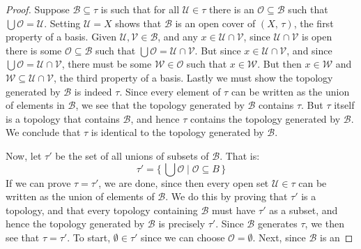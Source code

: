 \documentclass{article}
\theoremstyle{plain}
\theoremstyle{normal}
\begin{document}
        \begin{proof}
            Suppose $\mathcal{B}\subseteq\tau$ is such that for all
            $\mathcal{U}\in\tau$ there is an $\mathcal{O}\subseteq\mathcal{B}$
            such that $\bigcup\mathcal{O}=\mathcal{U}$. Setting
            $\mathcal{U}=X$ shows that $\mathcal{B}$ is an open cover of
            $(X,\,\tau)$, the first property of a basis. Given
            $\mathcal{U},\mathcal{V}\in\mathcal{B}$, and any
            $x\in\mathcal{U}\cap\mathcal{V}$, since $\mathcal{U}\cap\mathcal{V}$
            is open there is some $\mathcal{O}\subseteq\mathcal{B}$ such that
            $\bigcup\mathcal{O}=\mathcal{U}\cap\mathcal{V}$. But since
            $x\in\mathcal{U}\cap\mathcal{V}$, and since
            $\bigcup\mathcal{O}=\mathcal{U}\cap\mathcal{V}$, there must be some
            $\mathcal{W}\in\mathcal{O}$ such that $x\in\mathcal{W}$. But then
            $x\in\mathcal{W}$ and
            $\mathcal{W}\subseteq\mathcal{U}\cap\mathcal{V}$, the third property
            of a basis. Lastly we must show the topology generated by
            $\mathcal{B}$ is indeed $\tau$. Since every element of $\tau$ can
            be written as the union of elements in $\mathcal{B}$, we see that
            the topology generated by $\mathcal{B}$ contains $\tau$. But $\tau$
            itself is a topology that contains $\mathcal{B}$, and hence $\tau$
            contains the topology generated by $\mathcal{B}$. We conclude that
            $\tau$ is identical to the topology generated by $\mathcal{B}$.
            \par\hfill\par
            Now, let $\tau'$ be the set of all unions of subsets of
            $\mathcal{B}$. That is:
            \begin{equation}
                \tau'=\{\,\bigcup\mathcal{O}\;|\;\mathcal{O}\subseteq{B}\,\}
            \end{equation}
            If we can prove $\tau=\tau'$, we are done, since then every open
            set $\mathcal{U}\in\tau$ can be written as the union of elements of
            $\mathcal{B}$. We do this by proving that $\tau'$ is a topology, and
            that every topology containing $\mathcal{B}$ must have $\tau'$ as
            a subset, and hence the topology generated by $\mathcal{B}$ is
            precisely $\tau'$. Since $\mathcal{B}$ generates $\tau$, we then
            see that $\tau=\tau'$. To start, $\emptyset\in\tau'$ since we can
            choose $\mathcal{O}=\emptyset$. Next, since $\mathcal{B}$ is an

\end{proof}
\end{document}
